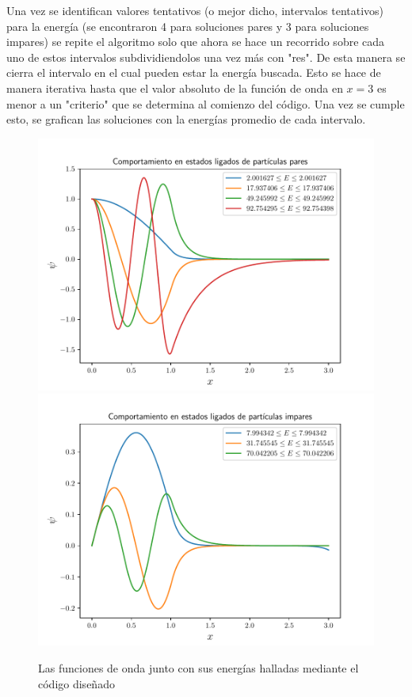 \documentclass{article}
\begin{document}
Una vez se identifican valores tentativos (o mejor dicho, intervalos tentativos) para la energ\'ia (se encontraron 4 para soluciones pares y 3 para soluciones impares) se repite el algoritmo solo que ahora se hace un recorrido sobre cada uno de estos intervalos subdividiendolos una vez m\'as con "res". De esta manera se cierra el intervalo en el cual pueden estar la energ\'ia buscada. Esto se hace de manera iterativa hasta que el valor absoluto de la funci\'on de onda en $x = 3$ es menor a un "criterio" que se determina al comienzo del c\'odigo. Una vez se cumple esto, se grafican las soluciones con la energ\'ias promedio de cada intervalo.

\begin{figure}
\includegraphics[width = \textwidth]{comportamiento_ligado_par.pdf}
\includegraphics[width = \textwidth]{comportamiento_ligado_impar.pdf}
\caption{Las funciones de onda junto con sus energ\'ias halladas mediante el c\'odigo dise\~nado}
\end{figure} 
\end{document}
